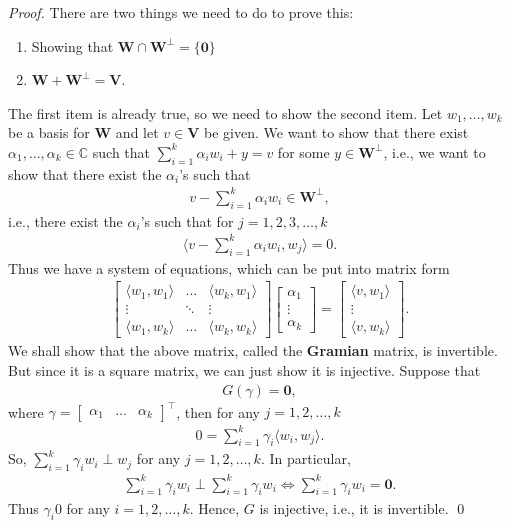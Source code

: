 \documentclass{book}
\theoremstyle{definition}
\newcommand{\C}{\mathbb{C}}
\newcommand{\V}{\mathbf{V}}
\newcommand{\W}{\mathbf{W}}
\newcommand{\la}{\langle}
\newcommand{\ra}{\rangle}
\begin{document}
\begin{proof}
	There are two things we need to do to prove this:
	\begin{enumerate}
		\item Showing that $\W \cap \W^\perp = \{ \mathbf{0} \}$
		\item $\W + \W^\perp = \V$.
	\end{enumerate}

	The first item is already true, so we need to show the second item. Let $w_1,\dots, w_k$ be a basis for $\W$ and let $v\in \V$ be given. We want to show that there exist $\alpha_1, \dots, \alpha_k \in \C$ such that $\sum^k_{i=1} \alpha_i w_i + y = v$ for some $y\in \W^\perp$, i.e., we want to show that there exist the $\alpha_i$'s such that 
	\begin{align*}
		v - \sum^k_{i=1}\alpha_iw_i \in \W^\perp,
	\end{align*}
	i.e., there exist the $\alpha_i$'s such that for $j = 1,2,3,\dots,k$
	\begin{align*}
	\la v - \sum^k_{i=1}\alpha_iw_i, w_j \ra = 0.
	\end{align*}
	Thus we have a system of equations, which can be put into matrix form
	\begin{align*}
	\begin{bmatrix}
	\la w_1, w_1 \ra & \dots & \la w_k, w_1 \ra\\
	\vdots& \ddots & \vdots\\
	\la w_1,w_k \ra&\dots & \la w_k,w_k\ra
	\end{bmatrix}
	\begin{bmatrix}
	\alpha_1\\\vdots\\\alpha_k
	\end{bmatrix}
	=
	\begin{bmatrix}
	\la v,w_1 \ra \\ \vdots \\ \la v,w_k \ra
	\end{bmatrix}.
	\end{align*}
	We shall show that the above matrix, called the \textbf{Gramian} matrix, is invertible. But since it is a square matrix, we can just show it is injective. Suppose that 
	\begin{align*}
	G(\gamma) = \mathbf{0},
	\end{align*}
	where $\gamma = \begin{bmatrix}
	\alpha_1&\dots&\alpha_k
	\end{bmatrix}^\top$, then for any $j = 1,2,\dots,k$
	\begin{align*}
	0 = \sum^k_{i=1}\gamma_i \la w_i, w_j \ra.
	\end{align*}
	So, $\sum^k_{i=1}\gamma_iw_i \perp w_j$ for any $j=1,2,\dots,k$. In particular, 
	\begin{align*}
	\sum^k_{i=1}\gamma_iw_i \perp \sum^k_{i=1}\gamma_iw_i \iff \sum^k_{i=1}\gamma_iw_i = \mathbf{0}. 
	\end{align*}
	Thus $\gamma_i 0$ for any $i=1,2,\dots,k$. Hence, $G$ is injective, i.e., it is invertible. \qed
	

	
\end{proof}
\end{document}

